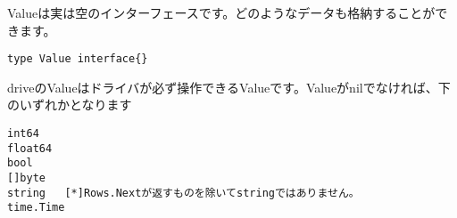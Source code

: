 Valueは実は空のインターフェースです。どのようなデータも格納することができます。

\begin{lstlisting}[numbers=none]
type Value interface{}
\end{lstlisting}

driveのValueはドライバが必ず操作できるValueです。Valueがnilでなければ、下のいずれかとなります

\begin{lstlisting}[numbers=none]
int64
float64
bool
[]byte
string   [*]Rows.Nextが返すものを除いてstringではありません。
time.Time
\end{lstlisting}
